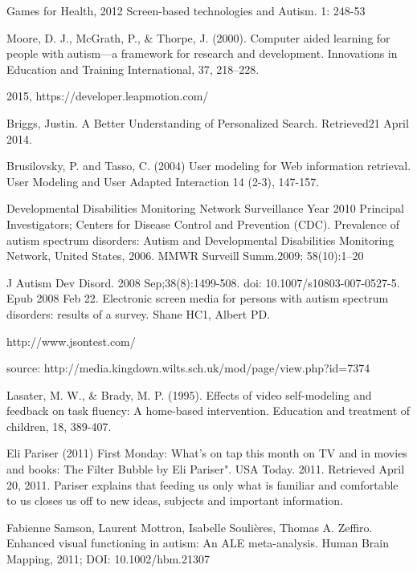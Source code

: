 \documentclass[10pt]{article}
\begin{document}
\begin{thebibliography}{100}

 Games for Health, 2012 Screen-based technologies and Autism. 1: 248-53

Moore, D. J., McGrath, P., \& Thorpe, J. (2000). Computer aided learning for people with autism—a framework for research and development. Innovations in Education and Training International, 37, 218–228.

 2015, https://developer.leapmotion.com/

Briggs, Justin. A Better Understanding of Personalized Search. Retrieved21 April 2014.


Brusilovsky, P. and Tasso, C. (2004) User modeling for Web information retrieval. User Modeling and User Adapted Interaction 14 (2-3), 147-157.


Developmental Disabilities Monitoring Network Surveillance Year 2010 Principal Investigators; Centers for Disease Control and Prevention (CDC). Prevalence of autism spectrum disorders: Autism and Developmental Disabilities Monitoring Network, United States, 2006. MMWR Surveill Summ.2009; 58(10):1–20


J Autism Dev Disord. 2008 Sep;38(8):1499-508. doi: 10.1007/s10803-007-0527-5. Epub 2008 Feb 22. Electronic screen media for persons with autism spectrum disorders: results of a survey.
Shane HC1, Albert PD.

http://www.jsontest.com/

source: http://media.kingdown.wilts.sch.uk/mod/page/view.php?id=7374

Lasater, M. W., \& Brady, M. P. (1995). Effects of video self-modeling and feedback on task fluency: A home-based intervention. Education and treatment of children, 18, 389-407.


Eli Pariser (2011) First Monday: What's on tap this month on TV and in movies and books: The Filter Bubble by Eli Pariser". USA Today. 2011. Retrieved April 20, 2011. Pariser explains that feeding us only what is familiar and comfortable to us closes us off to new ideas, subjects and important information.

Fabienne Samson, Laurent Mottron, Isabelle Soulières, Thomas A. Zeffiro. Enhanced visual functioning in autism: An ALE meta-analysis. Human Brain Mapping, 2011; DOI: 10.1002/hbm.21307


\end{thebibliography}
\end{document}
